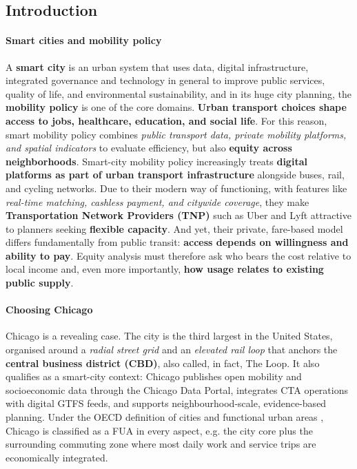 \documentclass[10pt, a4paper]{article}
\begin{document}
\subsection{Introduction}
    \paragraph{Smart cities and mobility policy} A \textbf{smart city} is an urban system that uses data, digital infrastructure, integrated governance and technology in general to improve public services, quality of life, and environmental sustainability, and in its huge city planning, the \textbf{mobility policy} is one of the core domains.
    \textbf{Urban transport choices shape access to jobs, healthcare, education, and social life}. For this reason, smart mobility policy combines \textit{public transport data, private mobility platforms, and spatial indicators} to evaluate efficiency, but also \textbf{equity across neighborhoods}.
    Smart-city mobility policy increasingly treats \textbf{digital platforms as part of urban transport infrastructure} alongside buses, rail, and cycling networks. Due to their modern way of functioning, with features like \textit{real-time matching, cashless payment, and citywide coverage}, they make \textbf{Transportation Network Providers (TNP)} such as Uber and Lyft attractive to planners seeking \textbf{flexible capacity}.
    And yet, their private, fare-based model differs fundamentally from public transit: \textbf{access depends on willingness and ability to pay}. Equity analysis must therefore ask who bears the cost relative to local income and, even more importantly, \textbf{how usage relates to existing public supply}.

    \paragraph{Choosing Chicago} Chicago is a revealing case. The city is the third largest in the United States, organised around a \textit{radial street grid} and an \textit{elevated rail loop} that anchors the \textbf{central business district (CBD)}, also called, in fact, The Loop. It also qualifies as a smart-city context: Chicago publishes open mobility and socioeconomic data through the Chicago Data Portal, integrates CTA operations with digital GTFS feeds, and supports neighbourhood-scale, evidence-based planning. Under the OECD definition of cities and functional urban areas \cite{oecd_fua2012}, Chicago is classified as a FUA in every aspect, e.g. the city core plus the surrounding commuting zone where most daily work and service trips are economically integrated. 
    
\end{document}
